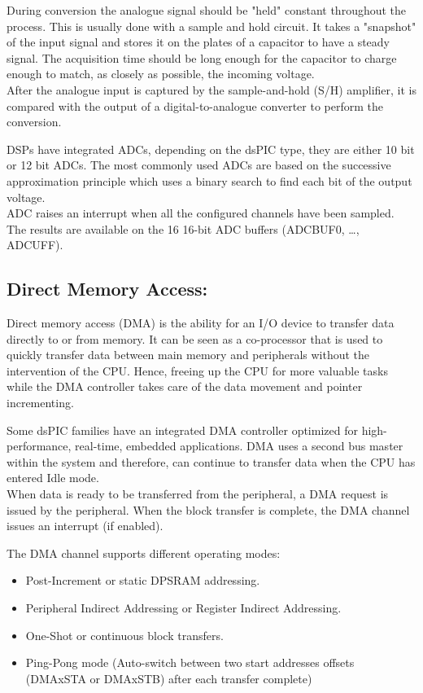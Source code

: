 During conversion the analogue signal should be "held" constant throughout the process. This is usually done with a sample and hold circuit. It takes a "snapshot" of the input signal and stores it on the plates of a capacitor to have a steady signal. The acquisition time should be long enough for the capacitor to charge enough to match, as closely as possible, the incoming voltage.\\
After the analogue input is captured by the sample-and-hold (S/H) amplifier, it is compared with the output of a digital-to-analogue converter to perform the conversion. 

DSPs have integrated ADCs, depending on the dsPIC type, they are either 10 bit or 12 bit ADCs.  The most commonly used ADCs are based on the successive approximation principle which uses a binary search to find each bit of the output voltage.\\
ADC raises an interrupt when all the configured channels have been sampled. The results are available on the 16 16-bit ADC buffers (ADCBUF0, …, ADCUFF).


\subsection{Direct Memory Access:}

Direct memory access (DMA) is the ability for an I/O device to transfer data directly to or from memory.  It can be seen as a co-processor that is used to quickly transfer data between main memory and peripherals without the intervention of the CPU. Hence, freeing up the CPU for more valuable tasks while the DMA controller takes care of the data movement and pointer incrementing.

Some dsPIC families have an integrated DMA controller optimized for high-performance, real-time, embedded applications. DMA uses a second bus master within the system and therefore, can continue to transfer data when the CPU has entered Idle mode.\\
When data is ready to be transferred from the peripheral, a DMA request is issued by the peripheral. When the block transfer is complete, the DMA channel issues an interrupt (if enabled).

The DMA channel supports different operating modes:
\begin{itemize}
    \item Post-Increment or static DPSRAM addressing.
    \item Peripheral Indirect Addressing or Register Indirect Addressing.
    \item One-Shot or continuous block transfers.
    \item Ping-Pong mode (Auto-switch between two start addresses offsets (DMAxSTA or DMAxSTB) after each transfer complete)
\end{itemize}





